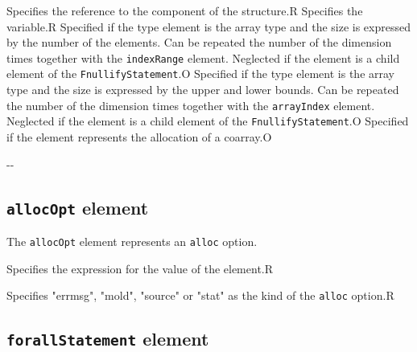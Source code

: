\begin{XcodeMLChildElements}
{Specifies the reference to the component of the structure.}{R}
{Specifies the variable.}{R}
{Specified if the type element is the array type and the size is expressed by the number of
 the elements. Can be repeated the number of the dimension times together with the {\tt indexRange} element.
 Neglected if the element is a child element of the {\tt FnullifyStatement}.}{O}
{Specified if the type element is the array type and the size is expressed by the upper and lower bounds.
 Can be repeated the number of the dimension times together with the {\tt arrayIndex} element.
 Neglected if the element is a child element of the {\tt FnullifyStatement}.}{O}
{Specified if the element represents the allocation of a coarray.}{O}
\end{XcodeMLChildElements}

\begin{XcodeMLAttributes}
\XcodeMLAttrDef{-}{-}
{-}{-}
\end{XcodeMLAttributes}


\subsection{ {\tt allocOpt} element}

The {\tt allocOpt} element represents an {\tt alloc} option.


\begin{XcodeMLChildElements}
{Specifies the expression for the value of the element.}{R}
\end{XcodeMLChildElements}

\begin{XcodeMLAttributes}
{Specifies "errmsg", "mold", "source" or "stat" as the kind of the {\tt alloc} option.}{R}
\end{XcodeMLAttributes}


\subsection{ {\tt forallStatement} element}


